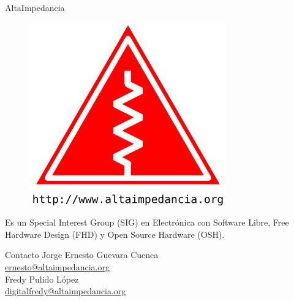 \documentclass{beamer}
\begin{document}
\begin{frame}{AltaImpedancia}
  \begin{figure}
    \includegraphics{img/altaimpedancia-acerca-de}
  \end{figure}
  \begin{block}{}
    Es un Special Interest Group (SIG) en Electrónica con Software Libre, Free Hardware Design (FHD) y Open Source Hardware (OSH).
  \end{block}
  \begin{block}{Contacto}
    \centering
    Jorge Ernesto Guevara Cuenca\\
    \href{mailto:ernesto@altaimpedancia.org}{ernesto@altaimpedancia.org}\\
    Fredy Pulido López\\
    \href{mailto:digitalfredy@altaimpedancia.org}{digitalfredy@altaimpedancia.org}
  \end{block}
\end{frame}
\end{document}
